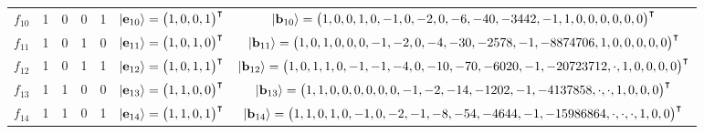 \documentclass{ws-procs9x6}
\begin{document}
\begin{sidewaystable}
{\begin{tabular}{ccccccc}
$f_{10}$&1  &  0 &   0 &   1  & $\vert {\bf e}_{10} \rangle=\begin{pmatrix} 1  ,  0 ,   0 ,   1  \end{pmatrix}^\intercal$&{\scriptsize$\vert {\bf b}_{10} \rangle=\begin{pmatrix}1 , 0 , 0 , 1 , 0 , -1 , 0 , -2 , 0 , -6 , -40 , -3442 , -1 , 1 , 0 , 0 , 0 , 0 , 0 , 0 \end{pmatrix}^\intercal                                 $}\\
$f_{11}$&1  &  0 &   1 &   0  & $\vert {\bf e}_{11} \rangle=\begin{pmatrix} 1  ,  0 ,   1 ,   0  \end{pmatrix}^\intercal$&{\scriptsize$\vert {\bf b}_{11} \rangle=\begin{pmatrix}1 , 0 , 1 , 0 , 0 , 0 , -1 , -2 , 0 , -4 , -30 , -2578 , -1 , -8874706 , 1 , 0 , 0 , 0 , 0 , 0 \end{pmatrix}^\intercal                          $}\\
$f_{12}$&1  &  0 &   1 &   1  & $\vert {\bf e}_{12} \rangle=\begin{pmatrix} 1  ,  0 ,   1 ,   1  \end{pmatrix}^\intercal$&{\scriptsize$\vert {\bf b}_{12} \rangle=\begin{pmatrix}1 , 0 , 1 , 1 , 0 , -1 , -1 , -4 , 0 , -10 , -70 , -6020 , -1 , -20723712 , \cdot , 1 , 0 , 0 , 0 , 0 \end{pmatrix}^\intercal                   $}\\
$f_{13}$&1  &  1 &   0 &   0  & $\vert {\bf e}_{13} \rangle=\begin{pmatrix} 1  ,  1 ,   0 ,   0  \end{pmatrix}^\intercal$&{\scriptsize$\vert {\bf b}_{13} \rangle=\begin{pmatrix}1 , 1 , 0 , 0 , 0 , 0 , 0 , 0 , -1 , -2 , -14 , -1202 , -1 , -4137858 , \cdot , \cdot , 1 , 0 , 0 , 0 \end{pmatrix}^\intercal                   $}\\
$f_{14}$&1  &  1 &   0 &   1  & $\vert {\bf e}_{14} \rangle=\begin{pmatrix} 1  ,  1 ,   0 ,   1  \end{pmatrix}^\intercal$&{\scriptsize$\vert {\bf b}_{14} \rangle=\begin{pmatrix}1 , 1 , 0 , 1 , 0 , -1 , 0 , -2 , -1 , -8 , -54 , -4644 , -1 , -15986864 , \cdot , \cdot , \cdot , 1 , 0 , 0 \end{pmatrix}^\intercal            $}\\

\end{tabular}}
\end{sidewaystable}
\end{document}
